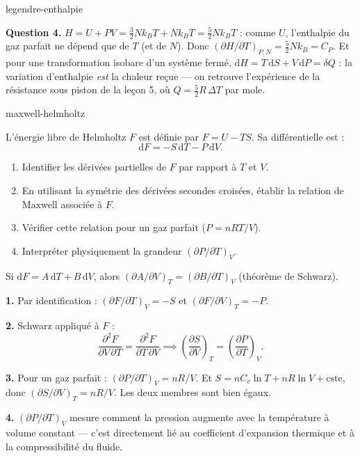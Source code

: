 \begin{exo}{legendre-enthalpie}
\begin{solution}
\textbf{Question 4.} $H = U + PV = \tfrac{3}{2}Nk_BT + Nk_BT = \tfrac{5}{2}Nk_BT$ : comme $U$, l'enthalpie du gaz parfait ne dépend que de $T$ (et de $N$). Donc $\left(\partial H/\partial T\right)_{P,N} = \tfrac{5}{2}Nk_B = C_P$. Et pour une transformation isobare d'un système fermé, $\mathrm{d}H = T\,\mathrm{d}S + V\,\mathrm{d}P = \delta Q$ : la variation d'enthalpie \emph{est} la chaleur reçue — on retrouve l'expérience de la résistance sous piston de la leçon 5, où $Q = \tfrac{5}{2}R\,\Delta T$ par mole.
\end{solution}
\end{exo}

\begin{exo}{maxwell-helmholtz}

L'énergie libre de Helmholtz $F$ est définie par $F = U - TS$. Sa différentielle est :
$$\mathrm{d}F = -S\,\mathrm{d}T - P\,\mathrm{d}V.$$

\begin{enumerate}
  \item Identifier les dérivées partielles de $F$ par rapport à $T$ et $V$.
  \item En utilisant la symétrie des dérivées secondes croisées, établir la relation de Maxwell associée à $F$.
  \item Vérifier cette relation pour un gaz parfait ($P = nRT/V$).
  \item Interpréter physiquement la grandeur $\left(\partial P/\partial T\right)_V$.
\end{enumerate}

\begin{indication}
Si $\mathrm{d}F = A\,\mathrm{d}T + B\,\mathrm{d}V$, alors $\left(\partial A/\partial V\right)_T = \left(\partial B/\partial T\right)_V$ (théorème de Schwarz).
\end{indication}

\begin{solution}
\textbf{1.} Par identification : $\left(\partial F/\partial T\right)_V = -S$ et $\left(\partial F/\partial V\right)_T = -P$.

\textbf{2.} Schwarz appliqué à $F$ :
$$\frac{\partial^2 F}{\partial V\,\partial T} = \frac{\partial^2 F}{\partial T\,\partial V} \implies \left(\frac{\partial S}{\partial V}\right)_T = \left(\frac{\partial P}{\partial T}\right)_V.$$

\textbf{3.} Pour un gaz parfait : $\left(\partial P/\partial T\right)_V = nR/V$. Et $S = nC_v\ln T + nR\ln V + \text{cste}$, donc $\left(\partial S/\partial V\right)_T = nR/V$. Les deux membres sont bien égaux. \checkmark

\textbf{4.} $\left(\partial P/\partial T\right)_V$ mesure comment la pression augmente avec la température à volume constant — c'est directement lié au coefficient d'expansion thermique et à la compressibilité du fluide.
\end{solution}

\end{exo}

